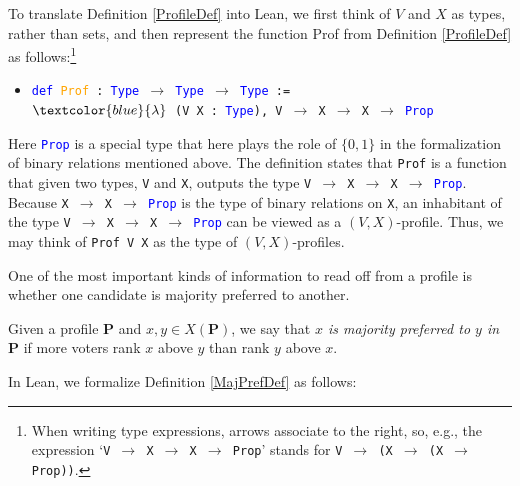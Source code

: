 \documentclass[runningheads]{llncs}
\begin{document}
To translate Definition \ref{ProfileDef} into Lean, we first think of $V$ and $X$ as types, rather than sets, and then represent the function \textsf{Prof} from Definition \ref{ProfileDef} as follows:\footnote{When writing type expressions, arrows associate to the right, so, e.g., the expression  `\texttt{V $\to$ X $\to$ X $\to$ Prop}' stands for \texttt{V $\to$ (X $\to$ (X $\to$ Prop))}.}
\begin{itemize}
\item[] \texttt{\textcolor{blue}{def} \textcolor{orange}{Prof} : \textcolor{blue}{Type} $\to$ \textcolor{blue}{Type} $\to$ \textcolor{blue}{Type} := }\\\texttt{$\textcolor{blue}{\lambda}$ (V X : \textcolor{blue}{Type}), V $\to$ X $\to$ X $\to$ \textcolor{blue}{Prop}}
\end{itemize}
Here \textcolor{blue}{\texttt{Prop}} is a special type that here plays the role of $\{0,1\}$ in the formalization of binary relations mentioned above.  The definition states that \texttt{Prof} is a function that given two types, \texttt{V} and \texttt{X}, outputs the type \texttt{V $\to$ X $\to$ X $\to$ \textcolor{blue}{Prop}}. Because \texttt{X $\to$ X $\to$ \textcolor{blue}{Prop}} is the type of binary relations on \texttt{X}, an inhabitant of the type \texttt{V $\to$ X $\to$ X $\to$ \textcolor{blue}{Prop}} can be viewed as a $(V,X)$-profile. Thus, we may think of \texttt{Prof V X} as the type of $(V,X)$-profiles.

One of the most important kinds of information to read off from a profile is whether one candidate is majority preferred to another.

\begin{definition}\label{MajPrefDef} \textnormal{Given a profile $\mathbf{P}$ and $x,y\in X(\mathbf{P})$, we say that \textit{$x$ is majority preferred to $y$ in $\mathbf{P}$} if more voters rank $x$ above $y$ than rank $y$ above $x$.}\end{definition}

In Lean, we formalize Definition \ref{MajPrefDef} as follows:
\end{document}
